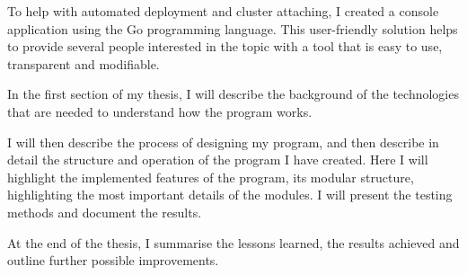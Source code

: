 To help with automated deployment and cluster attaching, I created a console application using the Go programming language. This user-friendly solution helps to provide several people interested in the topic with a tool that is easy to use, transparent and modifiable.

In the first section of my thesis, I will describe the background of the technologies that are needed to understand how the program works.

I will then describe the process of designing my program, and then describe in detail the structure and operation of the program I have created. Here I will highlight the implemented features of the program, its modular structure, highlighting the most important details of the modules. I will present the testing methods and document the results.

At the end of the thesis, I summarise the lessons learned, the results achieved and outline further possible improvements.

\vfill
\selectthesislanguage

\setcounter{romanPage}{\value{page}}
